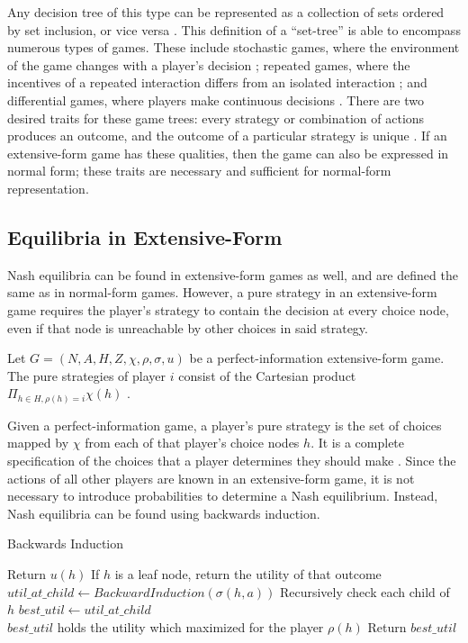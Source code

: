 Any decision tree of this type can be represented as a collection of sets ordered by set inclusion, or vice versa \cite{alos08}. This definition of a ``set-tree'' is able to encompass numerous types of games. These include stochastic games, where the environment of the game changes with a player's decision \cite{sola15}; repeated games, where the incentives of a repeated interaction differs from an isolated interaction \cite{mail06}; and differential games, where players make continuous decisions \cite{alos08}. There are two desired traits for these game trees: every strategy or combination of actions produces an outcome, and the outcome of a particular strategy is unique \cite{alos08}. If an extensive-form game has these qualities, then the game can also be expressed in normal form; these traits are necessary and sufficient for normal-form representation.\\

\subsection{Equilibria in Extensive-Form}
Nash equilibria can be found in extensive-form games as well, and are defined the same as in normal-form games. However, a pure strategy in an extensive-form game requires the player's strategy to contain the decision at every choice node, even if that node is unreachable by other choices in said strategy.\\
\begin{define}
  Let $G = (N, A, H, Z, \chi, \rho, \sigma, u)$ be a perfect-information extensive-form game. The pure strategies of player $i$ consist of the Cartesian product $\Pi_{h\in H, \rho(h)=i}\chi(h)$ \cite{shoh09}.
\end{define}
Given a perfect-information game, a player's pure strategy is the set of choices mapped by $\chi$ from each of that player's choice nodes $h$. It is a complete specification of the choices that a player determines they should make \cite{shoh09}. Since the actions of all other players are known in an extensive-form game, it is not necessary to introduce probabilities to determine a Nash equilibrium. Instead, Nash equilibria can be found using backwards induction.
\begin{algorithm}
  \caption{Backwards Induction}
  \begin{algorithmic}
    \State Return $u(h)$
    \Comment If $h$ is a leaf node, return the utility of that outcome
    \EndIf
    \State $util\_at\_child \gets BackwardInduction(\sigma(h, a))$
    \Comment Recursively check each child of $h$
    \State $best\_util\gets util\_at\_child$\\
    \Comment $best\_util$ holds the utility which maximized for the player $\rho(h)$
    \EndIf
    \EndFor
    \State Return $best\_util$
    \EndProcedure
  \end{algorithmic}
\end{algorithm}

